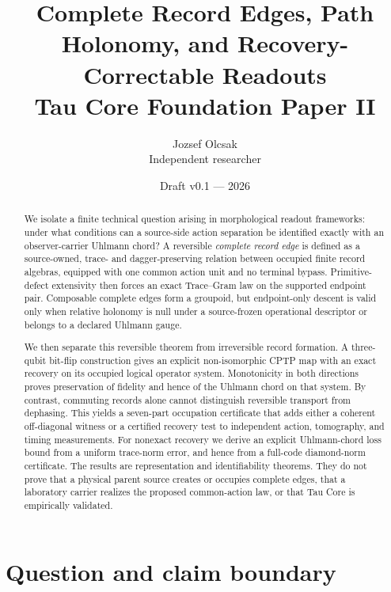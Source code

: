 \documentclass[11pt]{article}
\title{\textbf{Complete Record Edges, Path Holonomy, and Recovery-Correctable Readouts}\\
\large Tau Core Foundation Paper II}
\author{Jozsef Olcsak\\\small Independent researcher}
\date{Draft v0.1 --- 2026}
\begin{document}
\maketitle

\begin{abstract}
We isolate a finite technical question arising in morphological readout
frameworks: under what conditions can a source-side action separation be
identified exactly with an observer-carrier Uhlmann chord?  A reversible
\emph{complete record edge} is defined as a source-owned, trace- and
dagger-preserving relation between occupied finite record algebras, equipped
with one common action unit and no terminal bypass.  Primitive-defect
extensivity then forces an exact Trace--Gram law on the supported endpoint
pair.  Composable complete edges form a groupoid, but endpoint-only descent is
valid only when relative holonomy is null under a source-frozen operational
descriptor or belongs to a declared Uhlmann gauge.

We then separate this reversible theorem from irreversible record formation.
A three-qubit bit-flip construction gives an explicit non-isomorphic CPTP map
with an exact recovery on its occupied logical operator system.  Monotonicity
in both directions proves preservation of fidelity and hence of the Uhlmann
chord on that system.  By contrast, commuting records alone cannot distinguish
reversible transport from dephasing.  This yields a seven-part occupation
certificate that adds either a coherent off-diagonal witness or a certified
recovery test to independent action, tomography, and timing measurements.
For nonexact recovery we derive an explicit Uhlmann-chord loss bound from a
uniform trace-norm error, and hence from a full-code diamond-norm certificate.
The results are representation and identifiability theorems.  They do not
prove that a physical parent source creates or occupies complete edges, that a
laboratory carrier realizes the proposed common-action law, or that Tau Core
is empirically validated.
\end{abstract}

\tableofcontents
\clearpage

\section{Question and claim boundary}
\end{document}

